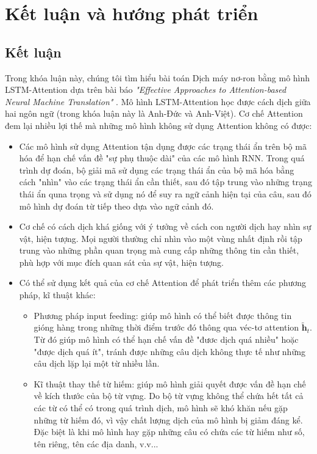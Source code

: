 \chapter{Kết luận và hướng phát triển}
\ifpdf
    \graphicspath{{Chapter5/Chapter5Figs/PNG/}{Chapter5/Chapter5Figs/PDF/}{Chapter5/Chapter5Figs/}}
\else
    \graphicspath{{Chapter5/Chapter5Figs/EPS/}{Chapter5/Chapter5Figs/}}
\fi
\label{chap_5}

\section{Kết luận}

Trong khóa luận này, chúng tôi tìm hiểu bài toán Dịch máy nơ-ron bằng mô hình LSTM-Attention dựa trên bài báo \textit{"Effective Approaches to Attention-based Neural Machine Translation"} \cite{attentionThangLuong2015}. Mô hình LSTM-Attention học được cách dịch giữa hai ngôn ngữ (trong khóa luận này là Anh-Đức và Anh-Việt). Cơ chế Attention đem lại nhiều lợi thế mà những mô hình không sử dụng Attention không có được:
\begin{itemize}
	\item Các mô hình sử dụng Attention tận dụng được các trạng thái ẩn trên bộ mã hóa để hạn chế vấn đề "sự phụ thuộc dài" của các mô hình RNN. Trong quá trình dự đoán, bộ giải mã sử dụng các trạng thái ẩn của bộ mã hóa bằng cách "nhìn" vào các trạng thái ẩn cần thiết, sau đó tập trung vào những trạng thái ẩn quna trọng và sử dụng nó để suy ra ngữ cảnh hiện tại của câu, sau đó mô hình dự đoán từ tiếp theo dựa vào ngữ cảnh đó.
	\item Cơ chế có cách dịch khá giống với ý tưởng về cách con người dịch hay nhìn sự vật, hiện tượng. Mọi người thường chỉ nhìn vào một vùng nhất định rồi tập trung vào những phần quan trọng mà cung cấp những thông tin cần thiết, phù hợp với mục đích quan sát của sự vật, hiện tượng.
	\item Có thể sử dụng kết quả của cơ chế Attention để phát triển thêm các phương pháp, kĩ thuật khác:
	\begin{itemize}
		\item Phương pháp input feeding: giúp mô hình có thể biết được thông tin gióng hàng trong những thời điểm trước đó thông qua véc-tơ attention $\bm{\tilde{h}}_t$. Từ đó giúp mô hình có thể hạn chế vấn đề "đươc dịch quá nhiều" hoặc "được dịch quá ít", tránh được những câu dịch không thực tế như những câu dịch lặp lại một từ nhiều lần.
		\item Kĩ thuật thay thế từ hiếm: giúp mô hình giải quyết được vấn đề hạn chế về kích thước của bộ từ vựng. Do bộ từ vựng không thể chứa hết tất cả các từ có thể có trong quá trình dịch, mô hình sẽ khó khăn nếu gặp những từ hiếm đó, vì vậy chất lượng dịch của mô hình bị giảm đáng kể. Đặc biệt là khi mô hình hay gặp những câu có chứa các từ hiếm như số, tên riêng, tên các địa danh, v.v... 
	\end{itemize}
\end{itemize}

